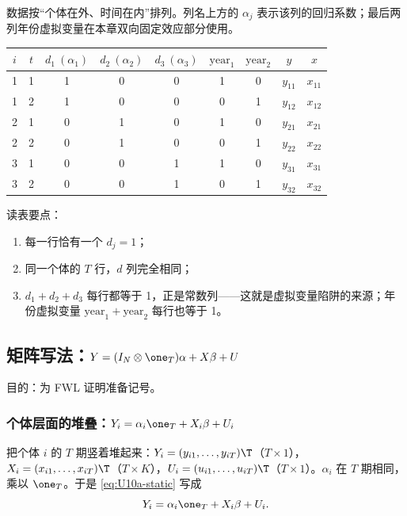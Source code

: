 数据按“个体在外、时间在内”排列。列名上方的 $\alpha_j$ 表示该列的回归系数；最后两列年份虚拟变量在本章双向固定效应部分使用。

\begin{center}\begin{minipage}{\linewidth}\centering
{}
\begin{tabular}{cc|ccc|cc|cc}
\toprule
$i$ & $t$ & $d_1\ (\alpha_1)$ & $d_2\ (\alpha_2)$ & $d_3\ (\alpha_3)$ & $\text{year}_1$ & $\text{year}_2$ & $y$ & $x$\\
\midrule
1 & 1 & 1 & 0 & 0 & 1 & 0 & $y_{11}$ & $x_{11}$\\
1 & 2 & 1 & 0 & 0 & 0 & 1 & $y_{12}$ & $x_{12}$\\
2 & 1 & 0 & 1 & 0 & 1 & 0 & $y_{21}$ & $x_{21}$\\
2 & 2 & 0 & 1 & 0 & 0 & 1 & $y_{22}$ & $x_{22}$\\
3 & 1 & 0 & 0 & 1 & 1 & 0 & $y_{31}$ & $x_{31}$\\
3 & 2 & 0 & 0 & 1 & 0 & 1 & $y_{32}$ & $x_{32}$\\
\bottomrule
\end{tabular}
\end{minipage}\end{center}

读表要点：
\begin{enumerate}
  \item 每一行恰有一个 $d_j=1$；
  \item 同一个体的 $T$ 行，$d$ 列完全相同；
  \item $d_1+d_2+d_3$ 每行都等于 1，正是常数列——这就是虚拟变量陷阱的来源；年份虚拟变量 $\text{year}_1+\text{year}_2$ 每行也等于 1。
\end{enumerate}

\subsection{矩阵写法：\texorpdfstring{$Y=(I_N\otimes\one_T)\alpha+X\beta+U$}{Y = (I\_N kron 1\_T) alpha + X beta + U}}

目的：为 FWL 证明准备记号。

\subsubsection{个体层面的堆叠：\texorpdfstring{$Y_i=\alpha_i\one_T+X_i\beta+U_i$}{Y\_i = alpha\_i 1 + X\_i beta + U\_i}}

把个体 $i$ 的 $T$ 期竖着堆起来：$Y_i=(y_{i1},\dots,y_{iT})\T$（$T\times1$），$X_i=(x_{i1},\dots,x_{iT})\T$（$T\times K$），$U_i=(u_{i1},\dots,u_{iT})\T$（$T\times 1$）。$\alpha_i$ 在 $T$ 期相同，乘以 $\one_T$。于是 \eqref{eq:U10a-static} 写成
\begin{equation}\label{eq:U10a-stacki}
Y_i=\alpha_i\one_T+X_i\beta+U_i.
\end{equation}

